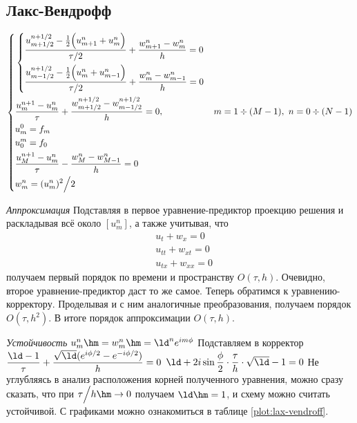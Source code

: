 \documentclass[a4paper,12pt]{article}
\begin{document}
\subsection{Лакс-Вендрофф}
\label{sec:lax-vendroff}
  \begin{equation}
    \left\{
    \begin{aligned}
      &
        \left\{
        \begin{aligned}
          &\frac{u_{m+1/2}^{n+1/2} - \frac{1}{2} \Bigl(u_{m+1}^n + u_m^n\Bigr)}{\tau / 2} +
            \frac{w_{m+1}^n - w_m^n}{h} = 0\\
          &\frac{u_{m-1/2}^{n+1/2} - \frac{1}{2} \Bigl(u_{m}^n + u_{m-1}^n\Bigr)}{\tau / 2} +
            \frac{w_{m}^n - w_{m-1}^n}{h} = 0\\
        \end{aligned}
        \right. & &{}\\
      &\frac{u_m^{n+1} - u_m^n}{\tau} + \frac{w_{m+1/2}^{n+1/2} - w_{m-1/2}^{n+1/2}}{h} = 0, &
        &m = 1 \div (M-1),\ n = 0 \div (N-1)\\
      &u_m^0 = f_m & &{}\\
      &u_0^m = f_0 & &{}\\
      &\frac{u_M^{n+1} - u_m^n}{\tau} - \frac{w_M^n - w_{M-1}^n}{h} = 0 & &{}\\
      &w_m^n = (u_m^n)^2 \Big/ 2 & &{}
    \end{aligned}
    \right.
    \label{eq:lax-vendroff}
  \end{equation}
  
  \jp
  \emph{Аппроксимация}
  \jp
  Подставляя в первое уравнение-предиктор проекцию решения и раскладывая всё около $[u_m^n]$, а также учитывая, что
  \[
    \begin{aligned}
      &u_t + w_x = 0\\
      &u_{tt} + w_{xt} = 0\\
      &u_{tx} + w_{xx} = 0
    \end{aligned}
  \]
  получаем первый порядок по времени и пространству $O(\tau, h)$.
  Очевидно, второе уравнение-предиктор даст то же самое.
  Теперь обратимся к уравнению-корректору.
  Проделывая и с ним аналогичные преобразования, получаем порядок $O(\tau, h^2)$.
  В итоге порядок аппроксимации $O(\tau, h)$.
  
  \jp
  \emph{Устойчивость}
  \jp
  $u_m^n \hm= w_m^n \hm= \ld^n e^{im\phi}$\jp
  Подставляем в корректор\jp
  $\dfrac{\ld - 1}{\tau} + \dfrac{\sqrt{\ld}(e^{i\phi/2} - e^{-i\phi/2})}{h} = 0$\jp
  $\ld + 2i\sin{\dfrac{\phi}{2}} \cdot \dfrac{\tau}{h} \cdot \sqrt{\ld} - 1 = 0$\jp
  Не углубляясь в анализ расположения корней полученного уравнения, можно сразу сказать, что при $\tau \Big/ h \hm\to 0$ получаем $\ld \hm= 1$, и схему можно считать устойчивой.
  \jp
  С графиками можно ознакомиться в таблице \ref{plot:lax-vendroff}.
\end{document}
